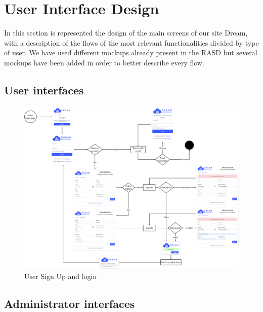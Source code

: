 \section{User Interface Design}

In this section is represented the design of the main screens of our site Dream, with a description of the flows of the most relevant functionalities divided by type of user. We have used different mockups already present in the RASD but several mockups have been added in order to better describe every flow.

\subsection{User interfaces}

\begin{figure}[h!]
        \centering
        \includegraphics[scale=0.14]{images/interfaces/user_login_interface.png}
        \caption{User Sign Up and login}
        \label{fig:user_sign_up_and_login}
\end{figure}
\FloatBarrier

\newpage
\subsection{Administrator interfaces}

